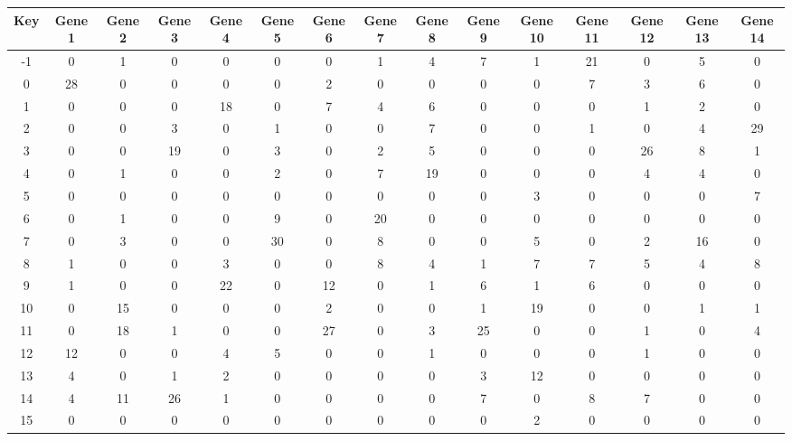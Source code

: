 \begin{tabular}{|c|c|c|c|c|c|c|c|c|c|c|c|c|c|c|}
\hline
Key & Gene 1 & Gene 2 & Gene 3 & Gene 4 & Gene 5 & Gene 6 & Gene 7 & Gene 8 & Gene 9 & Gene 10 & Gene 11 & Gene 12 & Gene 13 & Gene 14 \\
\hline
-1 & 0 & 1 & 0 & 0 & 0 & 0 & 1 & 4 & 7 & 1 & 21 & 0 & 5 & 0 \\
0 & 28 & 0 & 0 & 0 & 0 & 2 & 0 & 0 & 0 & 0 & 7 & 3 & 6 & 0 \\
1 & 0 & 0 & 0 & 18 & 0 & 7 & 4 & 6 & 0 & 0 & 0 & 1 & 2 & 0 \\
2 & 0 & 0 & 3 & 0 & 1 & 0 & 0 & 7 & 0 & 0 & 1 & 0 & 4 & 29 \\
3 & 0 & 0 & 19 & 0 & 3 & 0 & 2 & 5 & 0 & 0 & 0 & 26 & 8 & 1 \\
4 & 0 & 1 & 0 & 0 & 2 & 0 & 7 & 19 & 0 & 0 & 0 & 4 & 4 & 0 \\
5 & 0 & 0 & 0 & 0 & 0 & 0 & 0 & 0 & 0 & 3 & 0 & 0 & 0 & 7 \\
6 & 0 & 1 & 0 & 0 & 9 & 0 & 20 & 0 & 0 & 0 & 0 & 0 & 0 & 0 \\
7 & 0 & 3 & 0 & 0 & 30 & 0 & 8 & 0 & 0 & 5 & 0 & 2 & 16 & 0 \\
8 & 1 & 0 & 0 & 3 & 0 & 0 & 8 & 4 & 1 & 7 & 7 & 5 & 4 & 8 \\
9 & 1 & 0 & 0 & 22 & 0 & 12 & 0 & 1 & 6 & 1 & 6 & 0 & 0 & 0 \\
10 & 0 & 15 & 0 & 0 & 0 & 2 & 0 & 0 & 1 & 19 & 0 & 0 & 1 & 1 \\
11 & 0 & 18 & 1 & 0 & 0 & 27 & 0 & 3 & 25 & 0 & 0 & 1 & 0 & 4 \\
12 & 12 & 0 & 0 & 4 & 5 & 0 & 0 & 1 & 0 & 0 & 0 & 1 & 0 & 0 \\
13 & 4 & 0 & 1 & 2 & 0 & 0 & 0 & 0 & 3 & 12 & 0 & 0 & 0 & 0 \\
14 & 4 & 11 & 26 & 1 & 0 & 0 & 0 & 0 & 7 & 0 & 8 & 7 & 0 & 0 \\
15 & 0 & 0 & 0 & 0 & 0 & 0 & 0 & 0 & 0 & 2 & 0 & 0 & 0 & 0 \\
\hline
\end{tabular}